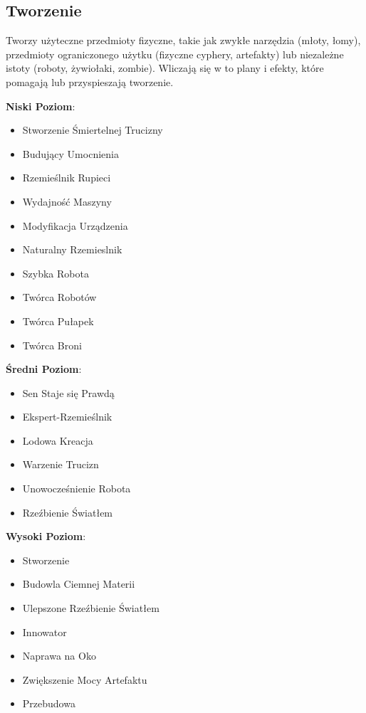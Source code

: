 \subsection{Tworzenie}

Tworzy użyteczne przedmioty fizyczne, takie jak zwykłe narzędzia (młoty, łomy), przedmioty ograniczonego użytku (fizyczne cyphery, artefakty) lub niezależne istoty (roboty, żywiołaki, zombie). Wliczają się w to plany i efekty, które pomagają lub przyspieszają tworzenie. 

\textbf{Niski Poziom}:

\begin{itemize}
\item Stworzenie Śmiertelnej Trucizny
\item Budujący Umocnienia
\item Rzemieślnik Rupieci
\item Wydajność Maszyny
\item Modyfikacja Urządzenia
\item Naturalny Rzemieslnik
\item Szybka Robota
\item Twórca Robotów
\item Twórca Pułapek
\item Twórca Broni
\end{itemize}

\textbf{Średni Poziom}:

\begin{itemize}
\item Sen Staje się Prawdą
\item Ekspert-Rzemieślnik
\item Lodowa Kreacja
\item Warzenie Trucizn
\item Unowocześnienie Robota
\item Rzeźbienie Światłem
\end{itemize}    
    
\textbf{Wysoki Poziom}:

\begin{itemize}
\item Stworzenie
\item Budowla Ciemnej Materii
\item Ulepszone Rzeźbienie Światłem
\item Innowator
\item Naprawa na Oko
\item Zwiększenie Mocy Artefaktu
\item Przebudowa
\end{itemize}

